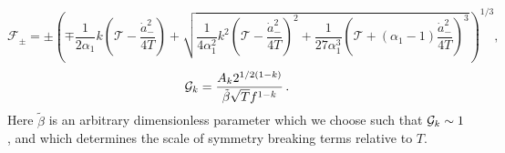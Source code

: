 \documentclass[a4paper,11pt]{article}
\begin{document}
  \begin{equation}
    \mathcal{F}_{\pm} = \pm \left(\mp\frac{1}{2\alpha_1}k \left(\mathcal{T}-\frac{{\dot{a}}_{-}^2}{4 T}\right) + \sqrt{ \frac{1}{4\alpha_1^2} k^2 \left(\mathcal{T}-\frac{{\dot{a}}_{-}^2}{4 T}\right)^2+\frac{1}{27\alpha_1^3}{\left(\mathcal{T}+\left(\alpha_1-1\right)\frac{{\dot{a}}_{-}^2}{4 T}\right)}^3}\right)^{1/3},
    \label{lag12c}
  \end{equation}
  \begin{equation}
    {\cal{G}}_k = \frac{A_k 2^{1/2 (1 - k)}}{\tilde \beta \sqrt T f^{1-k}}\,.
    \label{lag12d}
  \end{equation}
  Here $\tilde \beta$ is an arbitrary dimensionless parameter which we choose such that ${\cal{G}}_k \sim 1$, and which determines the scale of symmetry breaking terms relative to $T$.
  

\end{document}
